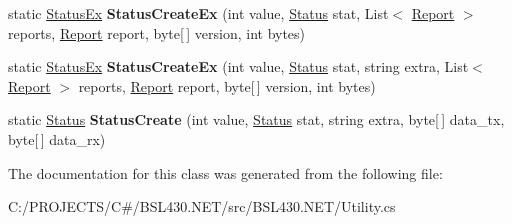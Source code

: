 \begin{DoxyCompactItemize}
\item 
\mbox{\label{class_b_s_l430___n_e_t_1_1_utility_1_1_utils_a3d8440fe0a3e5e30d258c87979917718}} 
static \mbox{\hyperlink{class_b_s_l430___n_e_t_1_1_status_ex}{Status\+Ex}} {\bfseries Status\+Create\+Ex} (int value, \mbox{\hyperlink{class_b_s_l430___n_e_t_1_1_status}{Status}} stat, List$<$ \mbox{\hyperlink{class_b_s_l430___n_e_t_1_1_report}{Report}} $>$ reports, \mbox{\hyperlink{class_b_s_l430___n_e_t_1_1_report}{Report}} report, byte\mbox{[}$\,$\mbox{]} version, int bytes)
\item 
\mbox{\label{class_b_s_l430___n_e_t_1_1_utility_1_1_utils_a1f1363474d2dcf9ef44248dc1538af0a}} 
static \mbox{\hyperlink{class_b_s_l430___n_e_t_1_1_status_ex}{Status\+Ex}} {\bfseries Status\+Create\+Ex} (int value, \mbox{\hyperlink{class_b_s_l430___n_e_t_1_1_status}{Status}} stat, string extra, List$<$ \mbox{\hyperlink{class_b_s_l430___n_e_t_1_1_report}{Report}} $>$ reports, \mbox{\hyperlink{class_b_s_l430___n_e_t_1_1_report}{Report}} report, byte\mbox{[}$\,$\mbox{]} version, int bytes)
\item 
\mbox{\label{class_b_s_l430___n_e_t_1_1_utility_1_1_utils_ab6eb94933dff53df67a95a2d18c40b58}} 
static \mbox{\hyperlink{class_b_s_l430___n_e_t_1_1_status}{Status}} {\bfseries Status\+Create} (int value, \mbox{\hyperlink{class_b_s_l430___n_e_t_1_1_status}{Status}} stat, string extra, byte\mbox{[}$\,$\mbox{]} data\+\_\+tx, byte\mbox{[}$\,$\mbox{]} data\+\_\+rx)
\end{DoxyCompactItemize}


The documentation for this class was generated from the following file\+:\begin{DoxyCompactItemize}
\item 
C\+:/\+P\+R\+O\+J\+E\+C\+T\+S/\+C\#/\+B\+S\+L430.\+N\+E\+T/src/\+B\+S\+L430.\+N\+E\+T/Utility.\+cs\end{DoxyCompactItemize}

